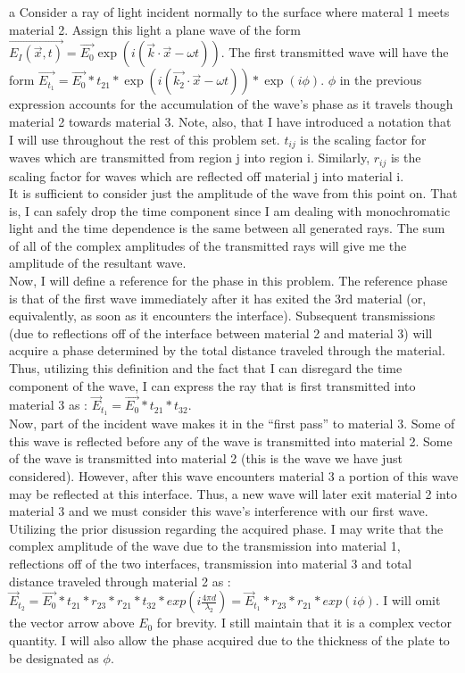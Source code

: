 \begin{homeworkProblem}
\begin{homeworkSection}{a}
Consider a ray of light incident normally to the surface where materal 1 meets material 2. Assign this light a plane wave of the form $\vec{E_I(\vec{x},t)} = \vec{E_0}\exp(i(\vec{k}\cdot\vec{x}-\omega t))$. The first transmitted wave will have the form $\vec{E_{t_1}} = \vec{E_0}*t_{21}*\exp(i(\vec{k_2}\cdot\vec{x}-\omega t))*\exp(i\phi)$. $\phi$ in the previous expression accounts for the accumulation of the wave's phase as it travels though material 2 towards material 3. Note, also, that I have introduced a notation that I will use throughout the rest of this problem set. $t_{ij}$ is the scaling factor for waves which are transmitted from region j into region i. Similarly, $r_{ij}$ is the scaling factor for waves which are reflected off material j into material i. 
\\
It is sufficient to consider just the amplitude of the wave from this point on. That is, I can safely drop the time component since I am dealing with monochromatic light and the time dependence is the same between all generated rays. The sum of all of the complex amplitudes of the transmitted rays will give me the amplitude of the resultant wave.
\\

Now, I will define a reference for the phase in this problem. The reference phase is that of the first wave immediately after it has exited the 3rd material (or, equivalently, as soon as it encounters the interface). Subsequent transmissions (due to reflections off of the interface between material 2 and material 3) will acquire a phase determined by the total distance traveled through the material. Thus, utilizing this definition and the fact that I can disregard the time component of the wave, I can express the ray that is first transmitted into material 3 as : $\vec{E}_{t_1} = \vec{E_0}*t_{21}*t_{32}$.
\\
Now, part of the incident wave makes it in the ``first pass'' to material 3. Some of this wave is reflected before any of the wave is transmitted into material 2. Some of the wave is transmitted into material 2 (this is the wave we have just considered). However, after this wave encounters material 3 a portion of this wave may be reflected at this interface. Thus, a new wave will later exit material 2 into material 3 and we must consider this wave's interference with our first wave.
\\

Utilizing the prior disussion regarding the acquired phase. I may write that the complex amplitude of the wave due to the transmission into material 1, reflections off of the two interfaces, transmission into material 3 and total distance traveled through material 2 as : $\vec{E}_{t_2} = \vec{E_0}*t_{21}*r_{23}*r_{21}*t_{32}*exp(i\frac{4\pi d}{\lambda_2}) = \vec{E}_{t_1}*r_{23}*r_{21}*exp(i\phi)$. I will omit the vector arrow above $E_0$ for brevity. I still maintain that it is a complex vector quantity. I will also allow the phase acquired due to the thickness of the plate to be designated as $\phi$. 
\\


\end{homeworkSection}
\end{homeworkProblem}

